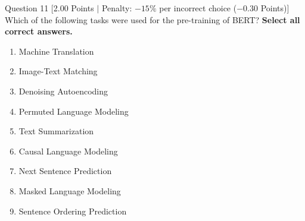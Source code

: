 \documentclass[11pt,a4paper]{article}
\begin{document}
\begin{questionbox}{Question 11 \hfill [2.00 Points $\vert$ Penalty: $-15\%$ per incorrect choice ($-0.30$ Points)]}
Which of the following tasks were used for the pre-training of BERT? \textbf{Select all correct answers.}

\begin{enumerate}[label=\alph*.,leftmargin=2em]
    \item Machine Translation
    \item Image-Text Matching
    \item Denoising Autoencoding
    \item Permuted Language Modeling
    \item Text Summarization
    \item Causal Language Modeling
    \item Next Sentence Prediction
    \item Masked Language Modeling
    \item Sentence Ordering Prediction
\end{enumerate}
\end{questionbox}

\newpage
\end{document}
